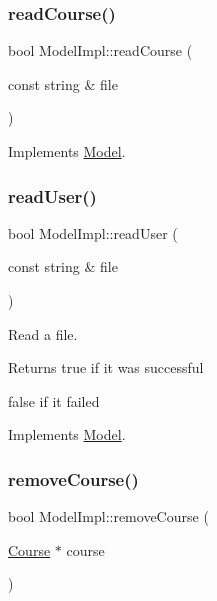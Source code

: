 \mbox{\label{classModelImpl_aba86d399703fe35c086d6ff5647e48da}} 
\subsubsection{\texorpdfstring{read\+Course()}{readCourse()}}
{\footnotesize\ttfamily bool Model\+Impl\+::read\+Course (\begin{DoxyParamCaption}\item[{const string \&}]{file }\end{DoxyParamCaption})\hspace{0.3cm}{\ttfamily [virtual]}}



Implements \hyperlink{classModel_a6a0784fa1dd4bffcebda8eb3bf38059e}{Model}.

\mbox{\label{classModelImpl_a132c46a2d6ca86c7374a065b3079fe15}} 
\subsubsection{\texorpdfstring{read\+User()}{readUser()}}
{\footnotesize\ttfamily bool Model\+Impl\+::read\+User (\begin{DoxyParamCaption}\item[{const string \&}]{file }\end{DoxyParamCaption})\hspace{0.3cm}{\ttfamily [virtual]}}



Read a file. 

\begin{DoxyReturn}{Returns}
true if it was successful 

false if it failed 
\end{DoxyReturn}


Implements \hyperlink{classModel_ad3fa273a7dc1397ce748c657e552d6cc}{Model}.

\mbox{\label{classModelImpl_ae46076a7e4b54d24ba15fb2eb8e7f33d}} 
\subsubsection{\texorpdfstring{remove\+Course()}{removeCourse()}}
{\footnotesize\ttfamily bool Model\+Impl\+::remove\+Course (\begin{DoxyParamCaption}\item[{\hyperlink{classCourse}{Course} $\ast$}]{course }\end{DoxyParamCaption})\hspace{0.3cm}{\ttfamily [virtual]}}



